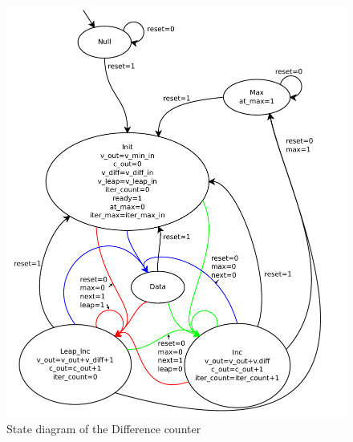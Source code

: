 \documentclass{article}
\begin{document}
\begin{figure}[h!]
  \centering
    \includegraphics[width=\textwidth]{state_diagrams/diff_counter.pdf}
  \caption{State diagram of the Difference counter}
\end{figure}
\end{document}
